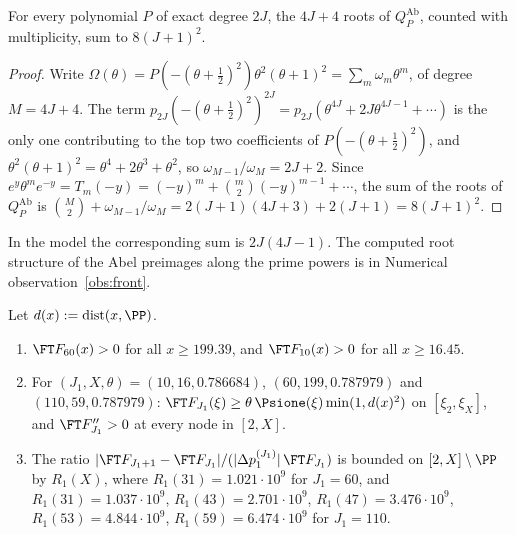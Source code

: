 \begin{lemma}\label{lem:Ttrace}
For every polynomial $P$ of exact degree $2J$, the $4J+4$ roots of $Q^{\mathrm{Ab}}_P$, counted with multiplicity, sum to
$8(J+1)^2$.
\end{lemma}

\begin{proof}
Write $\Omega(\theta)=P(-(\theta+\frac12)^2)\theta^2(\theta+1)^2=\sum_m\omega_m\theta^m$, of degree $M=4J+4$. The term
$p_{2J}(-(\theta+\frac12)^2)^{2J}=p_{2J}(\theta^{4J}+2J\theta^{4J-1}+\cdots)$ is the only one contributing to the top two
coefficients of $P(-(\theta+\frac12)^2)$, and $\theta^2(\theta+1)^2=\theta^4+2\theta^3+\theta^2$, so
$\omega_{M-1}/\omega_M=2J+2$. Since $e^y\theta^me^{-y}=T_m(-y)=(-y)^m+\binom m2(-y)^{m-1}+\cdots$, the sum of the roots of
$Q^{\mathrm{Ab}}_P$ is $\binom M2+\omega_{M-1}/\omega_M=2(J+1)(4J+3)+2(J+1)=8(J+1)^2$.
\end{proof}

In the model the corresponding sum is $2J(4J-1)$. The computed root structure of the Abel preimages along the
prime powers is in Numerical observation~\ref{obs:front}.

\begin{proposition}\label{prop:base}
Let $d(x):=\operatorname{dist}(x,\PP)$.
\begin{enumerate}[label=(\alph*),leftmargin=2em]
\item $\FT F_{60}(x)>0$ for all $x\ge199.39$, and $\FT F_{10}(x)>0$ for all $x\ge16.45$.
\item For $(J_1,X,\theta)=(10,16,0.786684)$, $(60,199,0.787979)$ and $(110,59,0.787979)$:
$\FT F_{J_1}(\xi)\ge\theta\,\Psione(\xi)\min(1,d(x)^2)$ on $[\xi_2,\xi_X]$, and $\FT F_{J_1}''>0$ at every node in $[2,X]$.
\item The ratio $\lvert\FT F_{J_1+1}-\FT F_{J_1}\rvert/(\lvert\Delta p_1^{(J_1)}\rvert\,\FT F_{J_1})$ is bounded on $[2,X]\setminus\PP$ by
$R_1(X)$, where $R_1(31)=1.021\cdot10^9$ for $J_1=60$, and $R_1(31)=1.037\cdot10^9$, $R_1(43)=2.701\cdot10^9$,
$R_1(47)=3.476\cdot10^9$, $R_1(53)=4.844\cdot10^9$, $R_1(59)=6.474\cdot10^9$ for $J_1=110$.
\end{enumerate}
\end{proposition}

